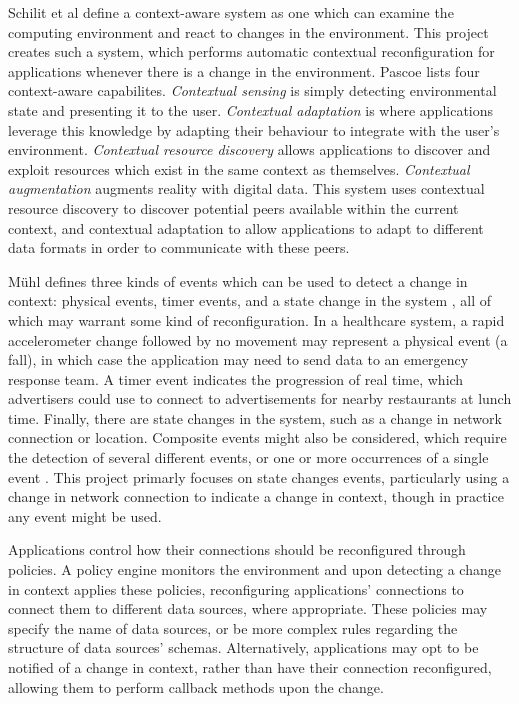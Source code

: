 \documentclass[12pt,twoside,notitlepage]{report}
\begin{document}
Schilit et al \cite{schilit1994context}  define a context-aware system as one which can examine the computing environment and react to changes in the environment. 
This project creates such a system, which performs automatic contextual reconfiguration for applications whenever there is a change in the environment. 
Pascoe \cite{pascoe1998adding} lists four context-aware capabilites. 
{\sl Contextual sensing} is simply detecting environmental state and presenting it to the user. 
{\sl Contextual adaptation} is where applications leverage this knowledge by adapting their behaviour to integrate with the user's environment. 
{\sl Contextual resource discovery} allows applications to discover and exploit resources which exist in the same context as themselves. 
{\sl Contextual augmentation} augments reality with digital data. 
This system uses contextual resource discovery to discover potential peers available within the current context, and contextual adaptation to allow  applications to adapt to different data formats in order to communicate with these peers.

M\"{u}hl defines three kinds of events which can be used to detect a change in context: physical events, timer events, and a state change in the system \cite[page 11]{muhl2006distributed}, all of which may warrant some kind of reconfiguration. 
In a healthcare system, a rapid accelerometer change followed by no movement may represent a physical event (a fall), in which case the application may need to send data to an emergency response team.
A timer event indicates the progression of real time, which advertisers could use to connect to advertisements for nearby restaurants at lunch time. 
Finally, there are state changes in the system, such as a change in network connection or location. 
Composite events might also be considered, which require the detection of several different events, or one or more occurrences of a single event \cite{chakravarthy1994composite}. 
This project primarly focuses on state changes events, particularly using a change in network connection to indicate a change in context, though in practice any event might be used.  

Applications control how their connections should be reconfigured through policies. 
A policy engine monitors the environment and upon detecting a change in context applies these policies, reconfiguring applications' connections to connect them to different data sources, where appropriate.
These policies may specify the name of data sources, or be more complex rules regarding the structure of data sources' schemas. 
Alternatively, applications may opt to be notified of a change in context, rather than have their connection reconfigured, allowing them to perform callback methods upon the change.
\end{document}
